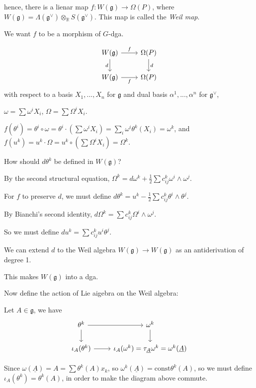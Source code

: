 \documentclass{article}
\theoremstyle{mystyle}
\theoremstyle{remark}
\numberwithin{equation}{section}
\begin{document}
hence, there is a lienar map $f\colon W(\mathfrak{g})\rightarrow \Omega(P)$, where $W(\mathfrak{g}) = \Lambda(\mathfrak{g}^\vee)\otimes_{\mathbb{R}} S(\mathfrak{g}^\vee)$. This map is called the \emph{Weil map}.

We want $f$ to be a morphism of $G$-\textsf{dga}.

$$\begin{tikzcd} W(\mathfrak{g})\ar[r,"f"]  \ar[d,"d"'] & \Omega(P) \ar[d, "d"] \\
W(\mathfrak{g}) \ar[r,"f"'] & \Omega(P)
\end{tikzcd}
$$
with respect to a basis $X_1,...,X_n$ for $\mathfrak{g}$ and dual basis $\alpha^1,...,\alpha^n$ for $\mathfrak{g}^\vee$,

$\omega = \sum \omega^iX_i$, $\Omega = \sum \Omega^i X_i$.

$f(\theta^i) = \theta^i\circ \omega = \theta^i\cdot(\sum \omega^i X_i) = \sum_i \omega^i\theta^k(X_i) = \omega^k$, and $f(u^k) = u^k\cdot \Omega = u^k\circ (\sum \Omega^i X_i) = \Omega^k$. 


How should $d\theta^k$ be defined in $W(\mathfrak{g})$?

By the second structural equation, $\Omega^k = d \omega^k + \frac{1}{2} \sum c^k_{ij} \omega^i\wedge \omega^j$.

For $f$ to preserve $d$, we must define $d\theta^k= u^k - \frac{1}{2} \sum c^k_{ij} \theta^i\wedge \theta^j$. 

By Bianchi's second identity, $d\Omega^k = \sum c^k_{ij} \Omega^i\wedge \omega^j$. 

So we must define $du^k = \sum c^k_{ij} u^i\theta^j$.

We can extend $d$ to the Weil algebra $W(\mathfrak{g})\rightarrow W(\mathfrak{g})$ as an antiderivation of degree 1.

This makes $W(\mathfrak{g})$ into a \textsf{dga}.

Now define the action of Lie aigebra on the Weil algebra:

Let $A \in \mathfrak{g}$, we have
$$
\begin{tikzcd} \theta^k\ar[r]\ar[d] & \omega^k \ar[d]\\ \iota_A(\theta^k)\ar[r] & \iota_A(\omega^k) = \tau_{\underline{A}} \omega^k = \omega^k(\underline{A})
\end{tikzcd}
$$


Since $\omega(\underline{A}) = A = \sum \theta^k(A) x_k$, so $\omega^k(\underline{A}) = \text{const} \theta^k(A)$, so we must define $\iota_A(\theta^k) = \theta^k(A)$, in order to make the diagram above commute. 
\end{document}

